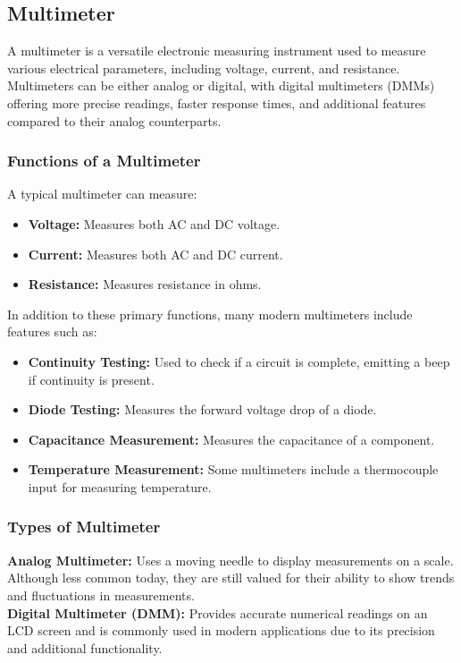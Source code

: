 \documentclass[a4paper,12pt]{article}
\begin{document}
	
\subsection{Multimeter}
A multimeter is a versatile electronic measuring instrument used to measure various electrical parameters, including voltage, current, and resistance. Multimeters can be either analog or digital, with digital multimeters (DMMs) offering more precise readings, faster response times, and additional features compared to their analog counterparts.

\subsubsection{Functions of a Multimeter}
A typical multimeter can measure:
\begin{itemize}
	\item \textbf{Voltage:} Measures both AC and DC voltage.
	\item \textbf{Current:} Measures both AC and DC current.
	\item \textbf{Resistance:} Measures resistance in ohms.
\end{itemize}
In addition to these primary functions, many modern multimeters include features such as:
\begin{itemize}
	\item \textbf{Continuity Testing:} Used to check if a circuit is complete, emitting a beep if continuity is present.
	\item \textbf{Diode Testing:} Measures the forward voltage drop of a diode.
	\item \textbf{Capacitance Measurement:} Measures the capacitance of a component.
	\item \textbf{Temperature Measurement:} Some multimeters include a thermocouple input for measuring temperature.
\end{itemize}

\subsubsection{Types of Multimeter}
\textbf{Analog Multimeter:} Uses a moving needle to display measurements on a scale. Although less common today, they are still valued for their ability to show trends and fluctuations in measurements. \\
\textbf{Digital Multimeter (DMM):} Provides accurate numerical readings on an LCD screen and is commonly used in modern applications due to its precision and additional functionality.
\end{document}

